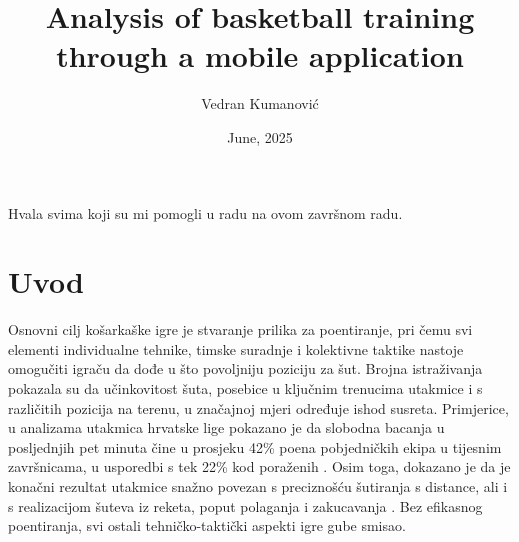 \documentclass[zavrsnirad]{fer}
\title{Analysis of basketball training through a mobile application}
\author{Vedran Kumanović}
\date{June, 2025}
\begin{document}
\maketitle






\begin{zahvale}
  Hvala svima koji su mi pomogli u radu na ovom završnom radu.
  
\end{zahvale}


\mainmatter


\tableofcontents


\chapter{Uvod}
\label{pog:uvod}

Osnovni cilj košarkaške igre je stvaranje prilika za poentiranje, pri čemu svi elementi individualne tehnike, timske suradnje i kolektivne taktike nastoje omogučiti igraču da dođe u što povoljniju poziciju za šut. 
Brojna istraživanja pokazala su da učinkovitost šuta, posebice u ključnim trenucima utakmice i s različitih pozicija na terenu, u značajnoj mjeri određuje ishod susreta. 
Primjerice, u analizama utakmica hrvatske lige pokazano je da slobodna bacanja u posljednjih pet minuta čine u prosjeku 42\% poena pobjedničkih ekipa u tijesnim završnicama, u usporedbi s tek 22\% kod poraženih \cite{kumanovic}.
Osim toga, dokazano je da je konačni rezultat utakmice snažno povezan s preciznošću šutiranja s distance, ali i s realizacijom šuteva iz reketa, poput polaganja i zakucavanja \cite{milanovic}.
Bez efikasnog poentiranja, svi ostali tehničko-taktički aspekti igre gube smisao. 
\end{document}
